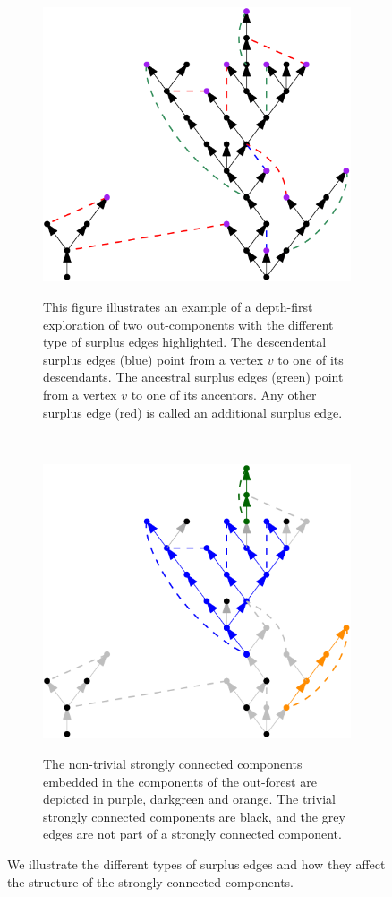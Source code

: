 \begin{figure}
\centering
\begin{subfigure}{0.7\textwidth}
 \centering
    \includegraphics[width=0.7\linewidth]{Content/Pictures/Types of surplus edges.png}
    \label{subfigure.typesofsurplusedges} 
    \caption{This figure illustrates an example of a depth-first exploration of two out-components with the different type of surplus edges highlighted. The descendental surplus edges (blue) point from a vertex $v$ to one of its descendants. The ancestral surplus edges (green) point from a vertex $v$ to one of its ancentors. Any other surplus edge (red) is called an additional surplus edge.}
\end{subfigure}\\
\begin{subfigure}{0.7\textwidth}
  \centering
  \includegraphics[width=0.7\linewidth]{Content/Pictures/SCC in example.png}
  \label{subfigure.sccinexample}
  \caption{The non-trivial strongly connected components embedded in the components of the out-forest are depicted in purple, darkgreen and orange. The trivial strongly connected components are black, and the grey edges are not part of a strongly connected component.}
\end{subfigure}
\caption{We illustrate the different types of surplus edges and how they affect the structure of the strongly connected components.}
\end{figure}




